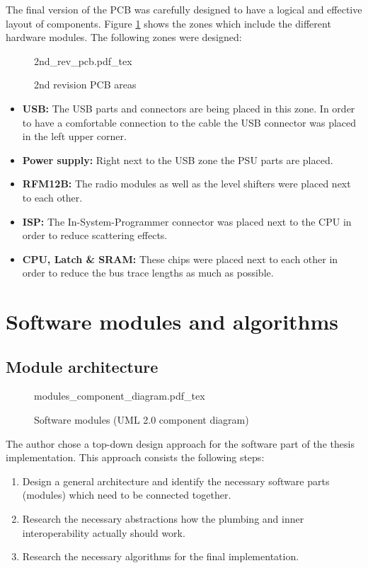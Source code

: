 The final version of the PCB was carefully designed to have a logical and effective layout of components. Figure \ref{fig:2ndrev_pcb} shows the zones which include the different hardware modules. The following zones were designed:

\begin{figure}[H]
    \centering
    {2nd_rev_pcb.pdf_tex}
    \caption{2nd revision PCB areas}
    \label{fig:2ndrev_pcb}
\end{figure}

\begin{itemize}
    \item \textbf{USB: } The USB parts and connectors are being placed in this zone. In order to have a comfortable connection to the cable the USB connector was placed in the left upper corner.
    \item \textbf{Power supply: } Right next to the USB zone the PSU parts are placed.
    \item \textbf{RFM12B: } The radio modules as well as the level shifters were placed next to each other.
    \item \textbf{ISP: } The In-System-Programmer connector was placed next to the CPU in order to reduce scattering effects.
    \item \textbf{CPU, Latch \& SRAM: } These chips were placed next to each other in order to reduce the bus trace lengths as much as possible.
\end{itemize}

\chapter{Software modules and algorithms}%
\section{Module architecture} %
\label{sec:module_architecture}

\begin{figure}[H]
\centering
{modules_component_diagram.pdf_tex}
\caption{Software modules (UML 2.0 component diagram)}
\label{fig:modules}
\end{figure}

The author chose a top-down design approach for the software part of the thesis implementation. This approach consists the following steps:

\begin{enumerate}
    \item Design a general architecture and identify the necessary software parts (modules) which need to be connected together.
    \item Research the necessary abstractions how the plumbing and inner interoperability actually should work.
    \item Research the necessary algorithms for the final implementation.
\end{enumerate}

